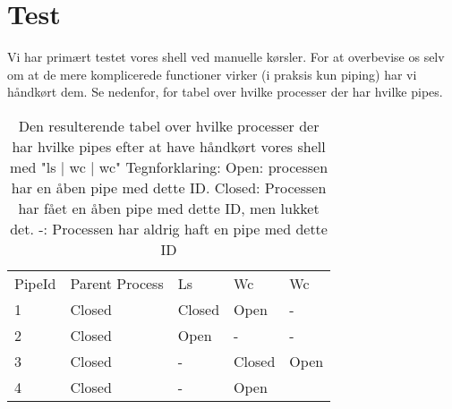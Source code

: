 \section{Test}
Vi har primært testet vores shell ved manuelle kørsler. For at overbevise os selv om at de mere komplicerede functioner virker (i praksis kun piping) har vi håndkørt dem. Se nedenfor, for tabel over hvilke processer der har hvilke pipes. 

\begin{table}[]
\centering
\begin{tabular}{lllll}
PipeId & Parent Process & Ls & Wc & Wc \\
1 & Closed & Closed & Open & - \\
2 & Closed & Open & - & - \\
3 & Closed & - & Closed & Open \\
4 & Closed & - & Open & 
\end{tabular}
\caption{Den resulterende tabel over hvilke processer der har hvilke pipes efter at have håndkørt vores shell med "ls | wc | wc" Tegnforklaring: Open: processen har en åben pipe med dette ID. Closed: Processen har fået en åben pipe med dette ID, men lukket det. -: Processen har aldrig haft en pipe med dette ID}
\label{test-tabel}
\end{table}
